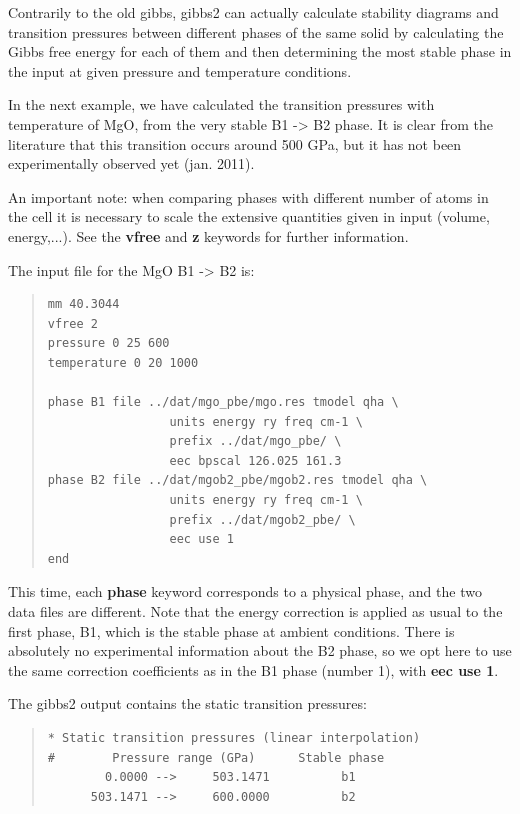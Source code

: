 \documentclass[a4paper]{article}
\begin{document}
Contrarily to the old gibbs, gibbs2 can actually calculate stability
diagrams and transition pressures between different phases of the same
solid by calculating the Gibbs free energy for each of them and then
determining the most stable phase in the input at given pressure and
temperature conditions.

In the next example, we have calculated the transition pressures with
temperature of MgO, from the very stable B1 -> B2 phase. It is clear
from the literature that this transition occurs around 500 GPa, but
it has not been experimentally observed yet (jan. 2011).

An important note: when comparing phases with different number of
atoms in the cell it is necessary to scale the extensive quantities
given in input (volume, energy,...). See the \textbf{vfree} and \textbf{z}
keywords for further information.

The input file for the MgO B1 -> B2 is:

\begin{quote}
\begin{verbatim}
mm 40.3044
vfree 2
pressure 0 25 600
temperature 0 20 1000

phase B1 file ../dat/mgo_pbe/mgo.res tmodel qha \
                 units energy ry freq cm-1 \
                 prefix ../dat/mgo_pbe/ \
                 eec bpscal 126.025 161.3
phase B2 file ../dat/mgob2_pbe/mgob2.res tmodel qha \
                 units energy ry freq cm-1 \
                 prefix ../dat/mgob2_pbe/ \
                 eec use 1
end
\end{verbatim}
\end{quote}

This time, each \textbf{phase} keyword corresponds to a physical phase, and
the two data files are different. Note that the energy correction is
applied as usual to the first phase, B1, which is the stable phase at
ambient conditions. There is absolutely no experimental information
about the B2 phase, so we opt here to use the same correction
coefficients as in the B1 phase (number 1), with \textbf{eec use 1}.

The gibbs2 output contains the static transition pressures:

\begin{quote}
\begin{verbatim}
* Static transition pressures (linear interpolation)
#        Pressure range (GPa)      Stable phase
        0.0000 -->     503.1471          b1
      503.1471 -->     600.0000          b2
\end{verbatim}
\end{quote}
\end{document}
